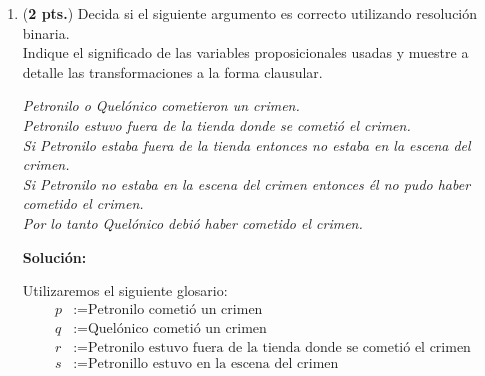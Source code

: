 \documentclass[11pt,letterpaper]{article}
\begin{document}
\begin{enumerate}
\item (\textbf{2 pts.}) Decida si el siguiente argumento es correcto utilizando 
resolución binaria. \\
  Indique el significado de las variables proposicionales usadas y muestre a 
  detalle las transformaciones a la forma clausular.
  
  \begin{center}

  \textit{Petronilo o Quel\'onico cometieron un crimen. \\ Petronilo estuvo 
  fuera de la tienda donde se cometi\'o el crimen. \\Si Petronilo estaba fuera
  de la tienda entonces no estaba en la escena del crimen. \\Si Petronilo
  no estaba en la escena del crimen entonces \'el no pudo haber cometido
  el crimen. \\Por lo tanto Quel\'onico debi\'o haber cometido el crimen.}

  \end{center}
  
  {\bf Solución:}

  Utilizaremos el siguiente glosario:
  \begin{align*}
    p &:= \text{Petronilo cometió un crimen} \\
    q &:= \text{Quelónico cometió un crimen} \\
    r &:= \text{Petronilo estuvo fuera de la tienda donde se cometió el crimen}\\
    s &:= \text{Petronillo estuvo en la escena del crimen} \\
  \end{align*}
  

\end{enumerate}
\end{document}
